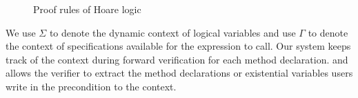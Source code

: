 \begin{figure}
    \caption{Proof rules of Hoare logic}
    \label{fig:choarelogic}
\end{figure}


We use $\Sigma$ to denote the dynamic context of logical variables and use $\Gamma$ to denote the context of specifications available for the expression to call. Our system keeps track of the context during forward verification for each method declaration.  and  allows the verifier to extract the method declarations or existential variables users write in the precondition to the context.


